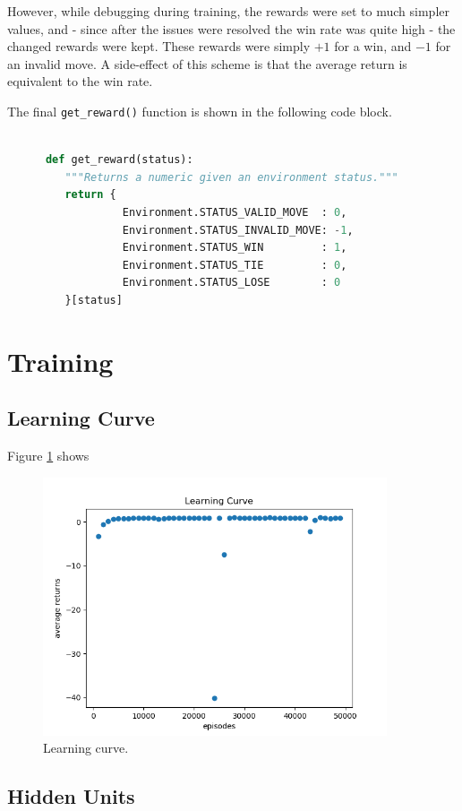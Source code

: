 \documentclass{article}
\begin{document}
   However, while debugging during training, the rewards were set to much simpler values, and - since
   after the issues were resolved the win rate was quite high - the changed rewards were kept. These rewards
   were simply $+1$ for a win, and $-1$ for an invalid move.
   A side-effect of this scheme is that the average return is equivalent to the win rate.

   The final \texttt{get\_reward()} function is shown in the following code block.
   \begin{lstlisting}[language=Python, label={reward}]

      def get_reward(status):
         """Returns a numeric given an environment status."""
         return {
                  Environment.STATUS_VALID_MOVE  : 0,
                  Environment.STATUS_INVALID_MOVE: -1,
                  Environment.STATUS_WIN         : 1,
                  Environment.STATUS_TIE         : 0,
                  Environment.STATUS_LOSE        : 0
         }[status]
   \end{lstlisting}


   \section{Training}
   \subsection{Learning Curve}
   Figure \ref{fig:5a} shows
      \begin{figure}[h] \centering
          \includegraphics[width=4in]{resources/part5a}
          \caption{Learning curve. }
          \label{fig:5a}
       \end{figure}

   \subsection{Hidden Units}
\end{document}
